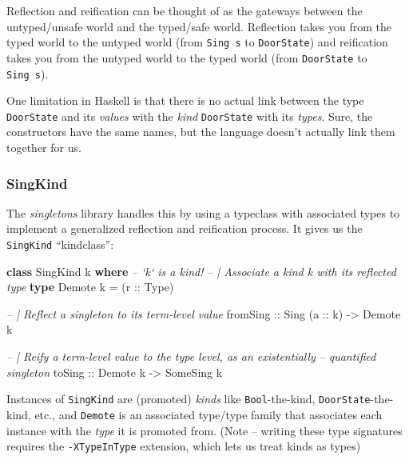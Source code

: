 \documentclass[]{article}
\newenvironment{Shaded}{}{}
\newcommand{\KeywordTok}[1]{\textcolor[rgb]{0.00,0.44,0.13}{\textbf{#1}}}
\newcommand{\DataTypeTok}[1]{\textcolor[rgb]{0.56,0.13,0.00}{#1}}
\newcommand{\CommentTok}[1]{\textcolor[rgb]{0.38,0.63,0.69}{\textit{#1}}}
\newcommand{\OtherTok}[1]{\textcolor[rgb]{0.00,0.44,0.13}{#1}}
\newcommand{\FunctionTok}[1]{\textcolor[rgb]{0.02,0.16,0.49}{#1}}
\newcommand{\NormalTok}[1]{#1}
\begin{document}
Reflection and reification can be thought of as the gateways between the
untyped/unsafe world and the typed/safe world. Reflection takes you from the
typed world to the untyped world (from \texttt{Sing\ s} to \texttt{DoorState})
and reification takes you from the untyped world to the typed world (from
\texttt{DoorState} to \texttt{Sing\ s}).

One limitation in Haskell is that there is no actual link between the type
\texttt{DoorState} and its \emph{values} with the \emph{kind} \texttt{DoorState}
with its \emph{types}. Sure, the constructors have the same names, but the
language doesn't actually link them together for us.

\subsubsection{SingKind}\label{singkind}

The \emph{singletons} library handles this by using a typeclass with associated
types to implement a generalized reflection and reification process. It gives us
the \texttt{SingKind} ``kindclass'':

\begin{Shaded}
\begin{Highlighting}[]
\KeywordTok{class} \DataTypeTok{SingKind}\NormalTok{ k }\KeywordTok{where}      \CommentTok{-- `k` is a kind!}
    \CommentTok{-- | Associate a kind k with its reflected type}
    \KeywordTok{type} \DataTypeTok{Demote}\NormalTok{ k }\FunctionTok{=}\NormalTok{ (}\OtherTok{r ::} \DataTypeTok{Type}\NormalTok{)}

    \CommentTok{-- | Reflect a singleton to its term-level value}
\OtherTok{    fromSing ::} \DataTypeTok{Sing}\NormalTok{ (}\OtherTok{a ::}\NormalTok{ k) }\OtherTok{->} \DataTypeTok{Demote}\NormalTok{ k}

    \CommentTok{-- | Reify a term-level value to the type level, as an existentially}
    \CommentTok{-- quantified singleton}
\OtherTok{    toSing ::} \DataTypeTok{Demote}\NormalTok{ k }\OtherTok{->} \DataTypeTok{SomeSing}\NormalTok{ k}
\end{Highlighting}
\end{Shaded}

Instances of \texttt{SingKind} are (promoted) \emph{kinds} like
\texttt{Bool}-the-kind, \texttt{DoorState}-the-kind, etc., and \texttt{Demote}
is an associated type/type family that associates each instance with the
\emph{type} it is promoted from. (Note -- writing these type signatures requires
the \texttt{-XTypeInType} extension, which lets us treat kinds as types)
\end{document}
